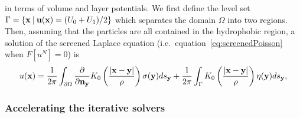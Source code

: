in terms of volume and layer potentials. We first define the level set
$\Gamma = \{\mathbf{x} \:|\: \mathbf{u}(\mathbf{x}) = (U_0 + U_1)/2 \}$ which separates the
domain $\Omega$ into two regions. Then, assuming that the particles are
all contained in the hydrophobic region, a solution of the screened
Laplace equation (i.e.~equation~\eqref{eq:screenedPoisson} when $F[u^N]
= 0$) is
\begin{align*}
  u(\mathbf{x}) = \frac{1}{2\pi} \int_{\partial\Omega} \frac{\partial }{\partial \mathbf{n}_{\mathbf{y}}} K_0 \left(
    \frac{|\mathbf{x} - \mathbf{y}|}{\rho}\right) \sigma(\mathbf{y}) ds_{\mathbf{y}} + 
    \frac{1}{2\pi} \int_{\Gamma} K_0 \left(
    \frac{|\mathbf{x} - \mathbf{y}|}{\rho} \right) \eta(\mathbf{y}) ds_{\mathbf{y}},
\end{align*}



\subsubsection{Accelerating the iterative solvers}
\label{subsec:NumericalIssues}

